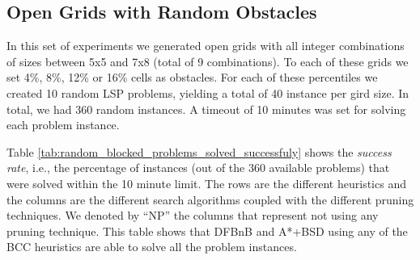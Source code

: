 \documentclass[letterpaper]{article} %
\begin{document}
\subsection{Open Grids with Random Obstacles}

In this set of experiments we generated open grids with all integer combinations of sizes between 5x5 and 7x8 (total of 9 combinations). To each of these grids we set 4\%, 8\%, 12\% or 16\% cells as obstacles. For each of these percentiles we created 10 random LSP problems, yielding a total of 40 instance per gird size. In total, we had 360 random instances. A timeout of 10 minutes was set for solving each problem instance. %



Table \ref{tab:random_blocked_problems_solved_successfuly} shows the \emph{success rate}, i.e., the percentage of instances (out of the 360 available problems) that were solved within the 10 minute limit. The rows are the different heuristics and the columns are the different search algorithms coupled with the different pruning techniques.
We denoted by ``NP'' the columns that represent not using any pruning technique. This table shows that DFBnB
and A*+BSD using any of the BCC heuristics are able to solve all the problem instances.
\end{document}
